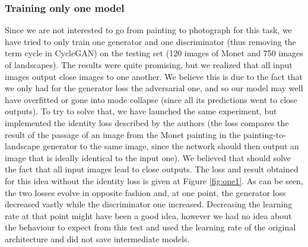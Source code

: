 \documentclass[twocolumn,superscriptaddress,aps,floatfix,nofootinbib]{revtex4-1}
\begin{document}
    \subsubsection{Training only one model}
    
    Since we are not interested to go from painting to photograph for this task, we have tried to only train one generator and one discriminator (thus removing the term cycle in CycleGAN) on the testing set (120 images of Monet and 750 images of landscapes). The results were quite promising, but we realized that all input images output close images to one another. We believe this is due to the fact that we only had for the generator loss the adversarial one, and so our model may well have overfitted or gone into mode collapse (since all its predictions went to close outputs). To try to solve that, we have launched the same experiment, but implemented the identity loss described by the authors (the loss compares the result of the passage of an image from the Monet painting in the painting-to-landscape generator to the same image, since the network should then output an image that is ideally identical to the input one). We believed that should solve the fact that all input images lead to close outputs. The loss and result obtained for this idea without the identity loss is given at Figure \ref{fig:one1}. As can be seen, the two losses evolve in opposite fashion and, at one point, the generator loss decreased vastly while the discriminator one increased. Decreasing the learning rate at that point might have been a good idea, however we had no idea about the behaviour to expect from this test and used the learning rate of the original architecture and did not save intermediate models.
    
\end{document}
